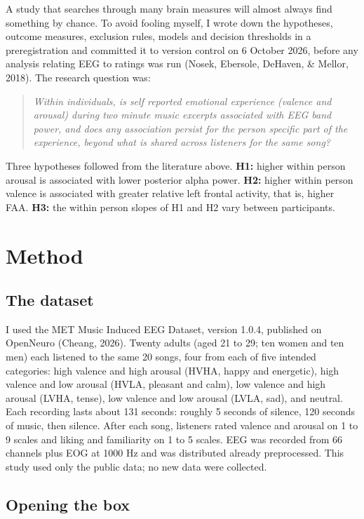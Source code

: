\documentclass[11pt,a4paper]{article}
\begin{document}
A study that searches through many brain measures will almost always find something by chance. To avoid fooling myself, I wrote down the hypotheses, outcome measures, exclusion rules, models and decision thresholds in a preregistration and committed it to version control on 6 October 2026, before any analysis relating EEG to ratings was run (Nosek, Ebersole, DeHaven, \& Mellor, 2018). The research question was:

\begin{quote}
\emph{Within individuals, is self reported emotional experience (valence and arousal) during two minute music excerpts associated with EEG band power, and does any association persist for the person specific part of the experience, beyond what is shared across listeners for the same song?}
\end{quote}

Three hypotheses followed from the literature above.
\textbf{H1:} higher within person arousal is associated with lower posterior alpha power.
\textbf{H2:} higher within person valence is associated with greater relative left frontal activity, that is, higher FAA.
\textbf{H3:} the within person slopes of H1 and H2 vary between participants.

\section{Method}

\subsection{The dataset}

I used the MET Music Induced EEG Dataset, version 1.0.4, published on OpenNeuro (Cheang, 2026). Twenty adults (aged 21 to 29; ten women and ten men) each listened to the same 20 songs, four from each of five intended categories: high valence and high arousal (HVHA, happy and energetic), high valence and low arousal (HVLA, pleasant and calm), low valence and high arousal (LVHA, tense), low valence and low arousal (LVLA, sad), and neutral. Each recording lasts about 131 seconds: roughly 5 seconds of silence, 120 seconds of music, then silence. After each song, listeners rated valence and arousal on 1 to 9 scales and liking and familiarity on 1 to 5 scales. EEG was recorded from 66 channels plus EOG at 1000 Hz and was distributed already preprocessed. This study used only the public data; no new data were collected.

\subsection{Opening the box}
\end{document}
